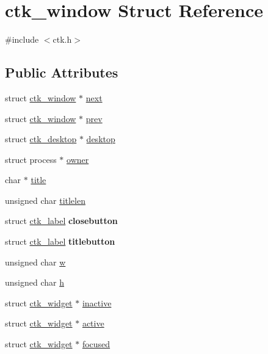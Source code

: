 \hypertarget{structctk__window}{}\section{ctk\+\_\+window Struct Reference}
\label{structctk__window}


{\ttfamily \#include $<$ctk.\+h$>$}

\subsection*{Public Attributes}
\begin{DoxyCompactItemize}
\item 
struct \hyperlink{structctk__window}{ctk\+\_\+window} $\ast$ \hyperlink{structctk__window_a92e81d0f1ffd6a52ce0fa29caedaca3c}{next}
\item 
struct \hyperlink{structctk__window}{ctk\+\_\+window} $\ast$ \hyperlink{structctk__window_a5c2fbd8367afa325aaf22c6bbf3c634f}{prev}
\item 
struct \hyperlink{structctk__desktop}{ctk\+\_\+desktop} $\ast$ \hyperlink{structctk__window_a7764e1224f692ae285ef706eb361991f}{desktop}
\item 
struct process $\ast$ \hyperlink{structctk__window_aa0a9f81cb95a7f999c2618ee2c19afe6}{owner}
\item 
char $\ast$ \hyperlink{structctk__window_a88d87bdebfbac969714162a150325eb9}{title}
\item 
unsigned char \hyperlink{structctk__window_a286ad62dacbe17e4a1becf8d1e2d8dc4}{titlelen}
\item 
\hypertarget{structctk__window_a005b5d9391461b5273fc45fe0ad08503}{}struct \hyperlink{structctk__label}{ctk\+\_\+label} {\bfseries closebutton}\label{structctk__window_a005b5d9391461b5273fc45fe0ad08503}

\item 
\hypertarget{structctk__window_a14887224b34c589fa49662b45ba9f6cb}{}struct \hyperlink{structctk__label}{ctk\+\_\+label} {\bfseries titlebutton}\label{structctk__window_a14887224b34c589fa49662b45ba9f6cb}

\item 
unsigned char \hyperlink{structctk__window_ae28cceb9e11fde55afc3abe1c29688b8}{w}
\item 
unsigned char \hyperlink{structctk__window_ae2d4a4d04e07beaf18e7581f42d317dc}{h}
\item 
struct \hyperlink{structctk__widget}{ctk\+\_\+widget} $\ast$ \hyperlink{structctk__window_ab37295c4d4a76d30daef3c05e4c14bc4}{inactive}
\item 
struct \hyperlink{structctk__widget}{ctk\+\_\+widget} $\ast$ \hyperlink{structctk__window_ad5cf5ddb025397eb66da6753ce8492a4}{active}
\item 
struct \hyperlink{structctk__widget}{ctk\+\_\+widget} $\ast$ \hyperlink{structctk__window_aace937271af9c37837634f8dedcb0cf1}{focused}
\end{DoxyCompactItemize}


